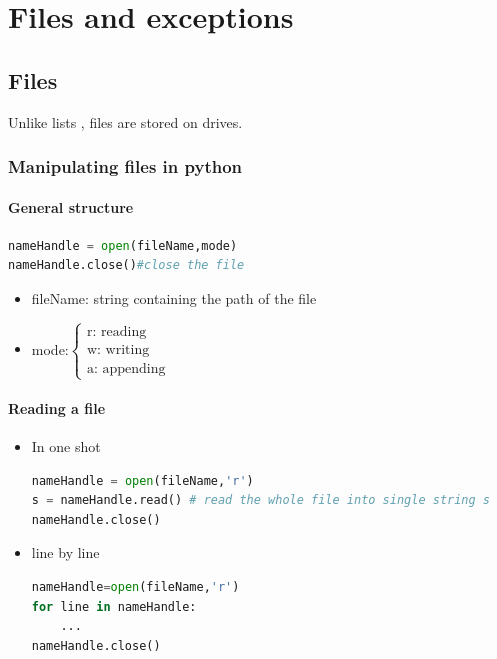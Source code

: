 \documentclass[12pt,oneside]{book}
\begin{document}
\chapter{Files and exceptions}
\section{Files}
Unlike lists , files are stored on drives.\\
\subsection{Manipulating files in python}
\subsubsection{General structure}
{\small\begin{lstlisting}[language=python]
nameHandle = open(fileName,mode)
nameHandle.close()#close the file
\end{lstlisting}}
\begin{itemize}
	\item fileName: string containing the path of the file
	\item mode:$\begin{cases}
			      \text{r: reading} \\
			      \text{w: writing} \\
			      \text{a: appending}
		      \end{cases}$
\end{itemize}
\subsubsection{Reading a file}
\begin{itemize}
	\item In one shot \\
	      \begin{lstlisting}[language=python]
nameHandle = open(fileName,'r')
s = nameHandle.read() # read the whole file into single string s
nameHandle.close()
\end{lstlisting}
	\item line by line\\
	      \begin{lstlisting}[language=python]
nameHandle=open(fileName,'r') 
for line in nameHandle:
	... 
nameHandle.close()
\end{lstlisting}
\end{itemize}
\end{document}
